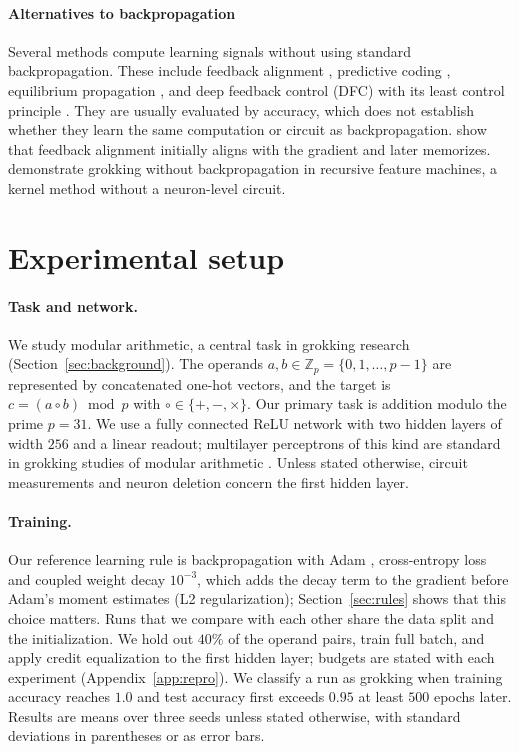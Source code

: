 \documentclass{article} %
\begin{document}
\paragraph{Alternatives to backpropagation}
Several methods compute learning signals without using standard backpropagation. These include feedback alignment \citep{lillicrap2016feedback,nokland2016dfa}, predictive coding \citep{whittington2017pc}, equilibrium propagation \citep{scellier2017eqprop}, and deep feedback control (DFC) with its least control principle \citep{meulemans2021dfc,meulemans2022lcp}. They are usually evaluated by accuracy, which does not establish whether they learn the same computation or circuit as backpropagation. \citet{refinetti2021align} show that feedback alignment initially aligns with the gradient and later memorizes. \citet{mallinar2025agop} demonstrate grokking without backpropagation in recursive feature machines, a kernel method without a neuron-level circuit.

\section{Experimental setup}
\label{sec:setup}

\paragraph{Task and network.} We study modular arithmetic, a central task in grokking research (Section~\ref{sec:background}). The operands $a, b \in \mathbb{Z}_p = \{0, 1, \ldots, p-1\}$ are represented by concatenated one-hot vectors, and the target is $c = (a \circ b) \bmod p$ with $\circ \in \{+, -, \times\}$. Our primary task is addition modulo the prime $p = 31$. We use a fully connected ReLU network with two hidden layers of width $256$ and a linear readout; multilayer perceptrons of this kind are standard in grokking studies of modular arithmetic \citep{gromov2023grokking,morwani2024feature}. Unless stated otherwise, circuit measurements and neuron deletion concern the first hidden layer.

\paragraph{Training.} Our reference learning rule is backpropagation with Adam \citep{kingma2015adam}, cross-entropy loss and coupled weight decay $10^{-3}$, which adds the decay term to the gradient before Adam's moment estimates (L2 regularization); Section~\ref{sec:rules} shows that this choice matters. Runs that we compare with each other share the data split and the initialization. We hold out $40\%$ of the operand pairs, train full batch, and apply credit equalization to the first hidden layer; budgets are stated with each experiment (Appendix~\ref{app:repro}). We classify a run as grokking when training accuracy reaches $1.0$ and test accuracy first exceeds $0.95$ at least $500$ epochs later. Results are means over three seeds unless stated otherwise, with standard deviations in parentheses or as error bars.
\end{document}
